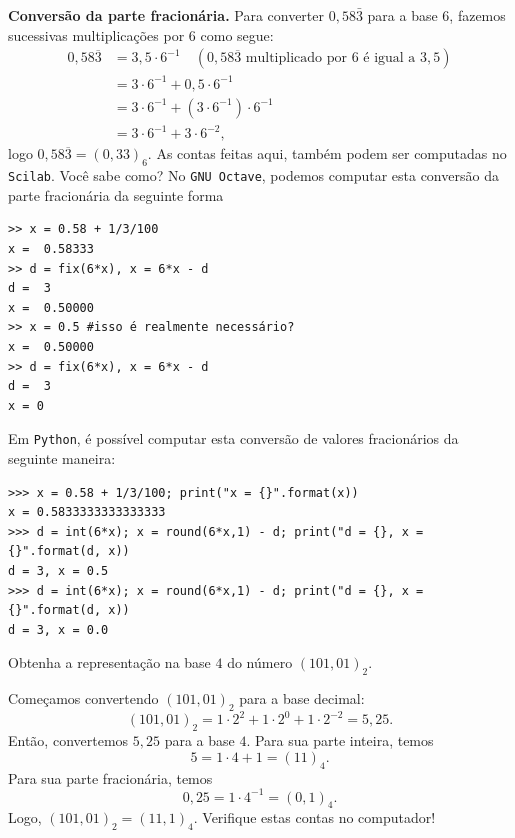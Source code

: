 \begin{resol}
{\bf Conversão da parte fracionária.} Para converter $0,58\bar{3}$ para a base $6$, fazemos sucessivas multiplicações por $6$ como segue:
  \begin{equation}
    \begin{split}
    0,58\overline{3} &= 3,5\cdot 6^{-1}\quad(\mbox{$0,58\overline{3}$ multiplicado por $6$ é igual a $3,5$})\\
    &= 3\cdot 6^{-1} + 0,5\cdot 6^{-1}\\
    &= 3\cdot 6^{-1} + (3\cdot 6^{-1})\cdot 6^{-1}\\
    &= 3\cdot 6^{-1} + 3\cdot 6^{-2},
    \end{split}
  \end{equation}
logo $0,58\overline{3} = (0,33)_6$.
\ifisscilab
As contas feitas aqui, também podem ser computadas no \verb+Scilab+. Você sabe como?
\fi
\ifisoctave
No \verb+GNU Octave+, podemos computar esta conversão da parte fracionária da seguinte forma
\begin{verbatim}
>> x = 0.58 + 1/3/100
x =  0.58333
>> d = fix(6*x), x = 6*x - d
d =  3
x =  0.50000
>> x = 0.5 #isso é realmente necessário?
x =  0.50000
>> d = fix(6*x), x = 6*x - d
d =  3
x = 0
\end{verbatim}
\fi
\ifispython
Em \verb+Python+, é possível computar esta conversão de valores fracionários da seguinte maneira:
\begin{verbatim}
>>> x = 0.58 + 1/3/100; print("x = {}".format(x))
x = 0.5833333333333333
>>> d = int(6*x); x = round(6*x,1) - d; print("d = {}, x = {}".format(d, x))
d = 3, x = 0.5
>>> d = int(6*x); x = round(6*x,1) - d; print("d = {}, x = {}".format(d, x))
d = 3, x = 0.0
\end{verbatim}
\fi
\end{resol}

\begin{exeresol}
  Obtenha a representação na base $4$ do número $(101,01)_2$.
\end{exeresol}
\begin{resol}
  Começamos convertendo $(101,01)_2$ para a base decimal:
  \begin{equation}
    (101,01)_2 = 1\cdot 2^2 + 1\cdot 2^0 + 1\cdot 2^{-2} = 5,25.
  \end{equation}
Então, convertemos $5,25$ para a base $4$. Para sua parte inteira, temos
\begin{equation}
  5 = 1\cdot 4 + 1 = (11)_4.
\end{equation}
Para sua parte fracionária, temos
\begin{equation}
  0,25 = 1\cdot 4^{-1} = (0,1)_4.
\end{equation}
Logo, $(101,01)_2 = (11,1)_4$. Verifique estas contas no computador!
\end{resol}

